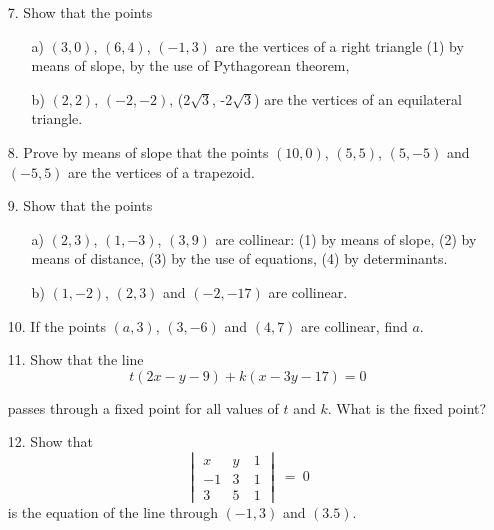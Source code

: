 \documentclass[11pt]{amsbook}
\begin{document}
\begin{enumerate}
	\item [7.] Show that the points
    	\begin{enumerate}
    		\item [a)] $(3, 0)$, $(6, 4)$, $(-1, 3)$ are the vertices of a right
    		triangle (1) by means of slope, by the use of Pythagorean theorem,
    
    		\item [b)] $(2, 2)$, $(-2, -2)$, (2$\sqrt{3}$, -2$\sqrt{3}$) are the vertices
    		of an equilateral triangle.
    	\end{enumerate}
	
	\item [8.] Prove by means of slope that the points $(10, 0)$, $(5, 5)$, $(5, -5)$ and
	    $(-5, 5)$ are the vertices of a trapezoid.
	
	\item [9.] Show that the points
	    \begin{enumerate}
    		\item [a)] $(2, 3)$, $(1, -3)$, $(3, 9)$ are collinear: 
    		(1) by means of slope, 
    		(2) by means of distance, 
    		(3) by the use of equations,
    		(4) by determinants.

		    \item [b)] $(1, -2)$, $(2, 3)$ and $(-2, -17)$ are collinear.
	    \end{enumerate}
	
	\item [10.] If the points $(a, 3)$, $(3, -6)$ and $(4, 7)$ are collinear, find $a$.
	
	\item [11.] Show that the line
	    \begin{equation*}
	         t(2x - y - 9) + k(x - 3y - 17) = 0
	    \end{equation*}
	    
	    \noindent passes through a fixed point for all values of $t$ and $k$. 
	    What is the fixed point?
	
	\item [12.] Show that
    	\begin{equation*}
    	    \begin{vmatrix}
                x & y & \ 1 \\ 
                -1 & 3 & \ 1 \\ 
                3 & 5 & \ 1
            \end{vmatrix}
            \ =\ 0
    	\end{equation*}
    	is the equation of the line through $(-1, 3)$ and $(3. 5)$.
    

\end{enumerate}
\end{document}
